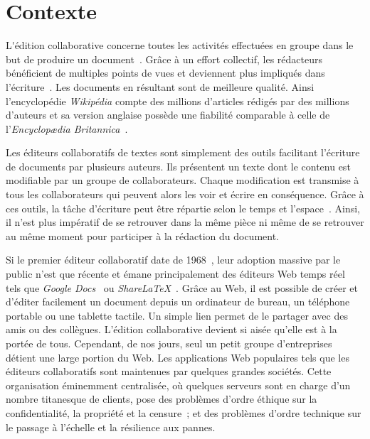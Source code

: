 
\section{Contexte}

\lettrine{L}'édition collaborative concerne toutes les activités effectuées en
groupe dans le but de produire un document~\cite{ellis1989concurrency,
  johansen1988groupware}. Grâce à un effort collectif, les rédacteurs
bénéficient de multiples points de vues et deviennent plus impliqués dans
l'écriture~\cite{noel2004empirical}. Les documents en résultant sont de
meilleure qualité. Ainsi l'encyclopédie \emph{Wikipédia} compte des millions
d'articles rédigés par des millions d'auteurs et sa version anglaise possède une
fiabilité comparable à celle de l'\emph{Encyclopædia
  Britannica}~\cite{giles2005internet}.

Les éditeurs collaboratifs de textes sont simplement des outils facilitant
l'écriture de documents par plusieurs auteurs. Ils présentent un texte dont le
contenu est modifiable par un groupe de collaborateurs. Chaque modification est
transmise à tous les collaborateurs qui peuvent alors les voir et écrire en
conséquence. Grâce à ces outils, la tâche d'écriture peut être répartie selon le
temps et l'espace~\cite{desanctis1987foundation, grudin1994computersupported,
  johansen1988groupware}. Ainsi, il n'est plus impératif de se retrouver dans la
même pièce ni même de se retrouver au même moment pour participer à la rédaction
du document.

Si le premier éditeur collaboratif date de 1968~\cite{engelbart1968research},
leur adoption massive par le public n'est que récente
et émane principalement des éditeurs Web temps réel~\cite{mogan2010impact,
  perkel2014scientific} tels que \emph{Google Docs}~\cite{googledocs} ou
\emph{ShareLaTeX}~\cite{sharelatex}. Grâce au Web, il est possible de créer et
d'éditer facilement un document depuis un ordinateur de bureau, un téléphone
portable ou une tablette tactile. Un simple lien permet de le partager avec des
amis ou des collègues. L'édition collaborative devient si aisée qu'elle est à la
portée de tous.  Cependant, de nos jours, seul un petit groupe d'entreprises
détient une large portion du Web. Les applications Web populaires tels que les
éditeurs collaboratifs sont maintenues par quelques grandes
sociétés.  %
Cette organisation éminemment centralisée, où quelques serveurs sont en charge
d'un nombre titanesque de clients, pose des problèmes d'ordre éthique sur la
confidentialité, la propriété et la censure~\cite{cherrueau2016composer,
  gellman2013us, pearson2011toward}; et des problèmes d'ordre technique sur le
passage à l'échelle et la résilience aux pannes.

